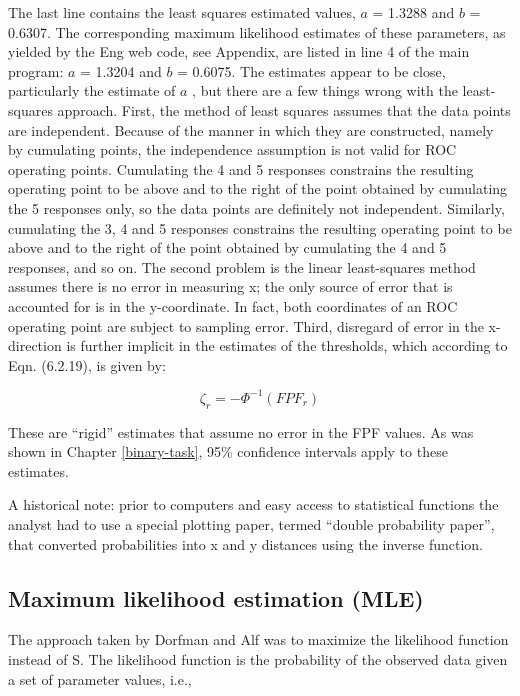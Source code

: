 \documentclass[
]{book}
\begin{document}
The last line contains the least squares estimated values, \(a\) = 1.3288 and \(b\) = 0.6307. The corresponding maximum likelihood estimates of these parameters, as yielded by the Eng web code, see Appendix, are listed in line 4 of the main program: \(a\) = 1.3204 and \(b\) = 0.6075. The estimates appear to be close, particularly the estimate of \(a\) , but there are a few things wrong with the least-squares approach. First, the method of least squares assumes that the data points are independent. Because of the manner in which they are constructed, namely by cumulating points, the independence assumption is not valid for ROC operating points. Cumulating the 4 and 5 responses constrains the resulting operating point to be above and to the right of the point obtained by cumulating the 5 responses only, so the data points are definitely not independent. Similarly, cumulating the 3, 4 and 5 responses constrains the resulting operating point to be above and to the right of the point obtained by cumulating the 4 and 5 responses, and so on. The second problem is the linear least-squares method assumes there is no error in measuring x; the only source of error that is accounted for is in the y-coordinate. In fact, both coordinates of an ROC operating point are subject to sampling error. Third, disregard of error in the x-direction is further implicit in the estimates of the thresholds, which according to Eqn. (6.2.19), is given by:

\begin{equation*} 
\zeta_r = - \Phi^{-1}\left ( FPF_r \right )
\end{equation*}

These are ``rigid'' estimates that assume no error in the FPF values. As was shown in Chapter \ref{binary-task}, 95\% confidence intervals apply to these estimates.

A historical note: prior to computers and easy access to statistical functions the analyst had to use a special plotting paper, termed ``double probability paper'', that converted probabilities into x and y distances using the inverse function.

\hypertarget{maximum-likelihood-estimation-mle}{%
\subsection{Maximum likelihood estimation (MLE)}\label{maximum-likelihood-estimation-mle}}

The approach taken by Dorfman and Alf was to maximize the likelihood function instead of S. The likelihood function is the probability of the observed data given a set of parameter values, i.e.,
\end{document}
